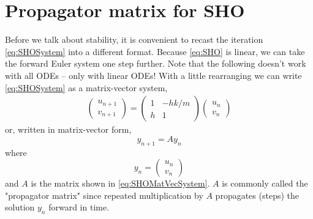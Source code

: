 \documentclass[hidelinks,notitlepage]{book}
\begin{document}
\section{Propagator matrix for SHO}
\label{sect:SHOPropagator}
Before we talk about stability, it is convenient to recast the iteration \cref{eq:SHOSystem} into a different format.
Because \cref{eq:SHO} is linear, we can take the forward Euler system one step further.  Note that the following doesn't work with all ODEs -- only with linear ODEs!  With a little rearranging we can write \cref{eq:SHOSystem} as a matrix-vector system,
\begin{align}
\label{eq:SHOMatVecSystem}
\begin{pmatrix}
u_{n+1} \\
v_{n+1}
\end{pmatrix}
=
\begin{pmatrix}
1 & - h k / m \\
h & 1
\end{pmatrix}
\begin{pmatrix}
u_{n} \\
v_{n}
\end{pmatrix}
\end{align}
or, written in matrix-vector form,
\begin{equation}
\label{eq:SHOMatVecForm}
\nonumber
{y_{n+1}} = {A} {y_n}
\end{equation}
where 
\begin{equation}
\nonumber
{y_n} = 
\begin{pmatrix}
u_{n} \\
v_{n}
\end{pmatrix}
\end{equation}
and ${A}$ is the matrix shown in \cref{eq:SHOMatVecSystem}.   ${A}$ is commonly called the "propagator matrix" since repeated multiplication by ${A}$ propagates (steps) the solution ${y_n}$ forward in time.
\end{document}
